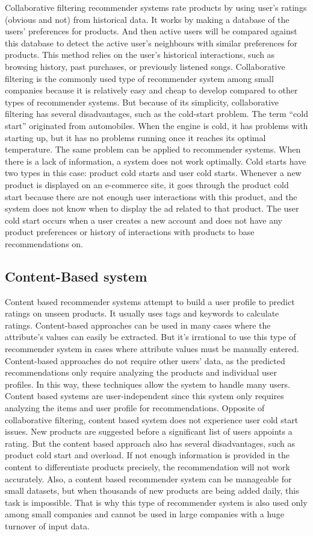 \documentclass[12pt]{article}
\begin{document}
Collaborative filtering recommender systems rate products by using user's ratings (obvious and not) from historical data. It works by making a database of the users’ preferences for products. And then active users will be compared against this database to detect the active user's neighbours with similar preferences for products. This method relies on the user's historical interactions, such as browsing history, past purchases, or previously listened songs. Collaborative filtering is the commonly used type of recommender system among small companies because it is relatively easy and cheap to develop compared to other types of recommender systems. 
But because of its simplicity, collaborative filtering has several disadvantages, such as the cold-start problem. The term “cold start” originated from automobiles. When the engine is cold, it has problems with starting up, but it has no problems running once it reaches its optimal temperature. The same problem can be applied to recommender systems. When there is a lack of information, a system does not work optimally. Cold starts have two types in this case: product cold starts and user cold starts. Whenever a new product is displayed on an e-commerce site, it goes through the product cold start because there are not enough user interactions with this product, and the system does not know when to display the ad related to that product. The user cold start occurs when a user creates a new account and does not have any product preferences or history of interactions with products to base recommendations on.
\cite{2.1}

\subsection{Content-Based system}

Content based recommender systems attempt to build a user profile to predict ratings on unseen products. It usually uses tags and keywords to calculate ratings. Content-based approaches can be used in many cases where the attribute’s values can easily be extracted. But it’s irrational to use this type of recommender system in cases where attribute values must be manually entered. Content-based approaches do not require other users’ data, as the predicted recommendations only require analyzing the products and individual user profiles. In this way, these techniques allow the system to handle many users. Content based systems are user-independent since this system only requires analyzing the items and user profile for recommendations. 
Opposite of collaborative filtering, content based system does not experience user cold start issues. New products are suggested before a significant list of users appoints a rating. But the content based approach also has several disadvantages, such as product cold start and overload. If not enough information is provided in the content to differentiate products precisely, the recommendation will not work accurately. Also, a content based recommender system can be manageable for small datasets, but when thousands of new products are being added daily, this task is impossible. That is why this type of recommender system is also used only among small companies and cannot be used in large companies with a huge turnover of input data.
\cite{2.2}
\end{document}
